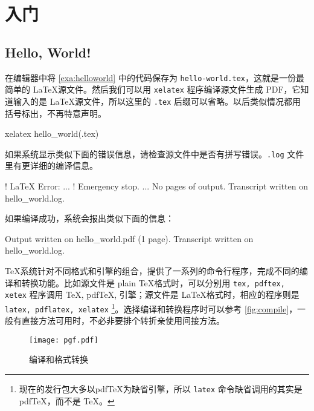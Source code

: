 \chapter{入门}

\section{Hello, World!}
\begin{example}[h]
\caption{Hello, World!}
\label{exa:helloworld}
\end{example}

在编辑器中将 \autoref{exa:helloworld} 中的代码保存为 \verb|hello-world.tex|，这就是一份最简单的 \LaTeX 源文件。然后我们可以用 \texttt{xelatex} 程序编译源文件生成 PDF，它知道输入的是 \LaTeX 源文件，所以这里的 \texttt{.tex} 后缀可以省略。以后类似情况都用括号标出，不再特意声明。

\begin{Code}[]
xelatex hello_world(.tex)
\end{Code}

如果系统显示类似下面的错误信息，请检查源文件中是否有拼写错误。\texttt{.log} 文件里有更详细的编译信息。

\begin{Code}[numbers=left]
! LaTeX Error:
...
! Emergency stop.
...
No pages of output.
Transcript written on hello_world.log.
\end{Code}

如果编译成功，系统会报出类似下面的信息：

\begin{Code}[]
Output written on hello_world.pdf (1 page).
Transcript written on hello_world.log.
\end{Code}

\TeX 系统针对不同格式和引擎的组合，提供了一系列的命令行程序，完成不同的编译和转换功能。比如源文件是 plain \TeX 格式时，可以分别用 \texttt{tex, pdftex, xetex} 程序调用 \TeX, pdfTeX, \XeTeX 引擎；源文件是 \LaTeX 格式时，相应的程序则是 \texttt{latex, pdflatex, xelatex} \footnote{现在的发行包大多以pdfTeX为缺省引擎，所以 \texttt{latex} 命令缺省调用的其实是 pdfTeX，而不是 \TeX 。}。选择编译和转换程序时可以参考 \autoref{fig:compile}，一般有直接方法可用时，不必非要排个转折亲使用间接方法。

\begin{figure}[htbp]
\centering
\texttt{[image: pgf.pdf]}
\caption{编译和格式转换}
\label{fig:compile}
\end{figure}

